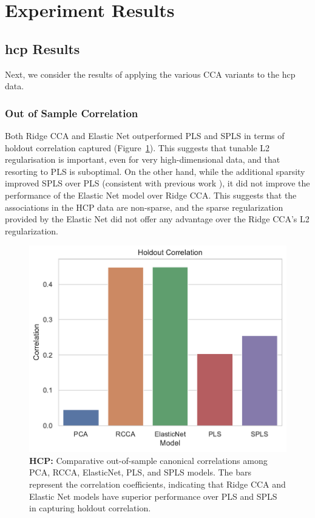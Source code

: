 \section{Experiment Results}

\subsection{\acrshort{hcp} Results}

Next, we consider the results of applying the various CCA variants to the \acrshort{hcp} data.

\subsubsection{Out of Sample Correlation}

Both Ridge CCA and Elastic Net outperformed PLS and SPLS in terms of holdout correlation captured (Figure~\ref{fig:performance}).
This suggests that tunable L2 regularisation is important, even for very high-dimensional data, and that resorting to PLS is suboptimal.
On the other hand, while the additional sparsity improved SPLS over PLS (consistent with previous work \citep{monteiro2016multiple}), it did not improve the performance of the Elastic Net model over Ridge CCA. This suggests that the associations in the HCP data are non-sparse, and the sparse regularization provided by the Elastic Net did not offer any advantage over the Ridge CCA's L2 regularization.

\begin{figure}[h]
    \centering
    \includegraphics[width=0.5\linewidth]{figures/hcp/holdout_correlations}
    \caption{\textbf{HCP:} Comparative out-of-sample canonical correlations among PCA, RCCA, ElasticNet, PLS, and SPLS models. The bars represent the correlation coefficients, indicating that Ridge CCA and Elastic Net models have superior performance over PLS and SPLS in capturing holdout correlation.}
    \label{fig:performance}
\end{figure}

